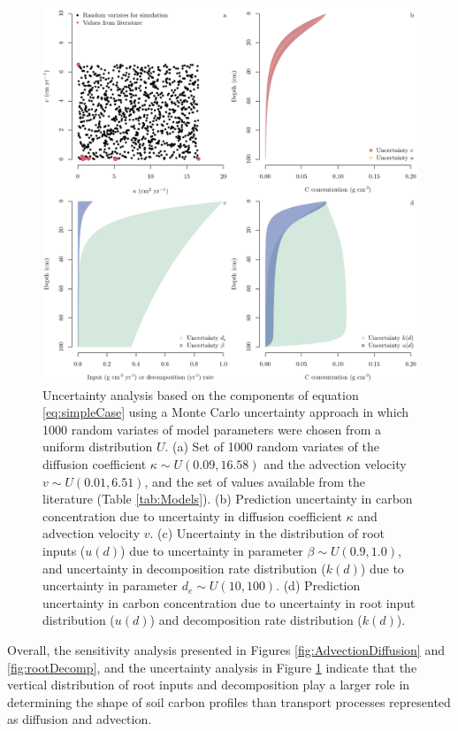 \documentclass[11pt, oneside, a4paper]{article}   	%
\begin{document}
\begin{figure}[t]
   \centering
   \includegraphics[width=\textwidth]{Figures/uncertainty.pdf} %
   \caption{Uncertainty analysis based on the components of equation \eqref{eq:simpleCase} using a Monte Carlo uncertainty approach in which 1000 random variates of model parameters were chosen from a uniform distribution $U$. (a) Set of 1000 random variates of the diffusion coefficient $\kappa \sim U(0.09, 16.58)$ and the advection velocity $v \sim U(0.01, 6.51)$, and the set of values available from the literature (Table \ref{tab:Models}). (b) Prediction uncertainty in carbon concentration due to uncertainty in diffusion coefficient $\kappa$ and advection velocity $v$. (c) Uncertainty in the distribution of root inputs ($u(d)$) due to uncertainty in parameter $\beta \sim U(0.9, 1.0)$, and uncertainty in decomposition rate distribution ($k(d)$) due to uncertainty in parameter $d_e \sim U(10, 100)$. (d) Prediction uncertainty in carbon concentration due to uncertainty in root input distribution ($u(d)$) and decomposition rate distribution ($k(d)$). }
   \label{fig:uncertainty}
\end{figure}

Overall, the sensitivity analysis presented in Figures \ref{fig:AdvectionDiffusion} and \ref{fig:rootDecomp}, and the uncertainty analysis in Figure \ref{fig:uncertainty} indicate that the vertical distribution of root inputs and decomposition play a larger role in determining the shape of soil carbon profiles than transport processes represented as diffusion and advection. 
\end{document}
